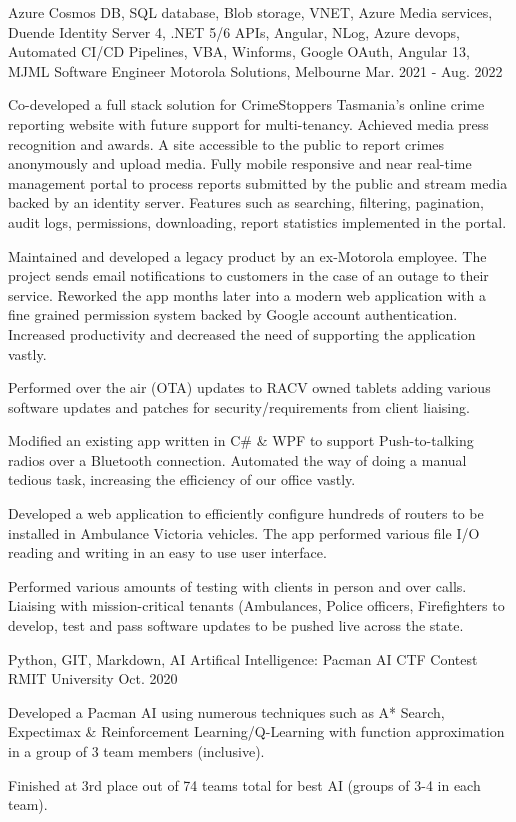 \begin{cventries}
{    }
  \cventry
    {Azure Cosmos DB, SQL database, Blob storage, VNET, Azure Media services, Duende Identity Server 4, .NET 5/6 APIs, Angular, NLog, Azure devops, Automated CI/CD Pipelines, VBA, Winforms, Google OAuth, Angular 13, MJML}
    {Software Engineer}
    {Motorola Solutions, Melbourne}
    {Mar. 2021 - Aug. 2022}
    {
      \begin{cvitems}
        \item {Co-developed a full stack solution for CrimeStoppers Tasmania's online crime reporting website with future support for multi-tenancy. Achieved media press recognition and awards. A site accessible to the public to report crimes anonymously and upload media. Fully mobile responsive and near real-time management portal to process reports submitted by the public and stream media backed by an identity server. Features such as searching, filtering, pagination, audit logs, permissions, downloading, report statistics implemented in the portal.}
		\item {Maintained and developed a legacy product by an ex-Motorola employee. The project sends email notifications to customers in the case of an outage to their service. Reworked the app months later into a modern web application with a fine grained permission system backed by Google account authentication. Increased productivity and decreased the need of supporting the application vastly.}
        \item {Performed over the air (OTA) updates to RACV owned tablets adding various software updates and patches for security/requirements from client liaising.}
		\item {Modified an existing app written in C\# \& WPF to support Push-to-talking radios over a Bluetooth connection. Automated the way of doing a manual tedious task, increasing the efficiency of our office vastly.}
        \item {Developed a web application to efficiently configure hundreds of routers to be installed in Ambulance Victoria vehicles. The app performed various file I/O reading and writing in an easy to use user interface.}
        \item {Performed various amounts of testing with clients in person and over calls. Liaising with mission-critical tenants (Ambulances, Police officers, Firefighters} to develop, test and pass software updates to be pushed live across the state.
      \end{cvitems}
    }
  \cventry
    {Python, GIT, Markdown, AI}
    {Artifical Intelligence: Pacman AI CTF Contest}
    {RMIT University}
    {Oct. 2020}
    {
      \begin{cvitems}
        \item {Developed a Pacman AI using numerous techniques such as A* Search, Expectimax \& Reinforcement Learning/Q-Learning with function approximation in a group of 3 team members (inclusive).}
        \item {Finished at 3rd place out of 74 teams total for best AI (groups of 3-4 in each team).}
      \end{cvitems}
    }
\end{cventries}
